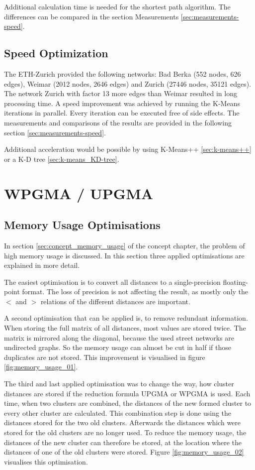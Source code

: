 Additional calculation time is needed for the shortest path algorithm. The differences can be compared in the section Measurements \ref{sec:measurements-speed}.

\subsection{Speed Optimization}
The ETH-Zurich provided the following networks: Bad Berka (552 nodes, 626 edges), Weimar (2012 nodes, 2646 edges) and Zurich (27446 nodes, 35121 edges). The network Zurich with factor 13 more edges than Weimar resulted in long processing time. A speed improvement was achieved by running the K-Means iterations in parallel. Every iteration can be executed free of side effects. The measurements and comparisons of the results are provided in the following section \ref{sec:measurements-speed}.

Additional acceleration would be possible by using K-Means++ \ref{sec:k-means++} or a K-D tree \ref{sec:k-means_KD-tree}.

\pagebreak
\section{WPGMA / UPGMA}
\subsection{Memory Usage Optimisations} \label{sec:memory_usage}
In section \ref{sec:concept_memory_usage} of the concept chapter, the problem of high memory usage is discussed. In this section three applied optimisations are explained in more detail.

The easiest optimisation is to convert all distances to a single-precision floating-point format. The loss of precision is not affecting the result, as mostly only the $<$ and $>$ relations of the different distances are important.

A second optimisation that can be applied is, to remove redundant information. When storing the full matrix of all distances, most values are stored twice. The matrix is mirrored along the diagonal, because the used street networks are undirected graphs. So the memory usage can almost be cut in half if those duplicates are not stored. This improvement is visualised in figure \ref{fig:memory_usage_01}.

The third and last applied optimisation was to change the way, how cluster distances are stored if the reduction formula \acrshort{UPGMA} or \acrshort{WPGMA} is used. Each time, when two clusters are combined, the distances of the new formed cluster to every other cluster are calculated. This combination step is done using the distances stored for the two old clusters. Afterwards the distances which were stored for the old clusters are no longer used. To reduce the memory usage, the distances of the new cluster can therefore be stored, at the location where the distances of one of the old clusters were stored. Figure \ref{fig:memory_usage_02} visualises this optimisation.


